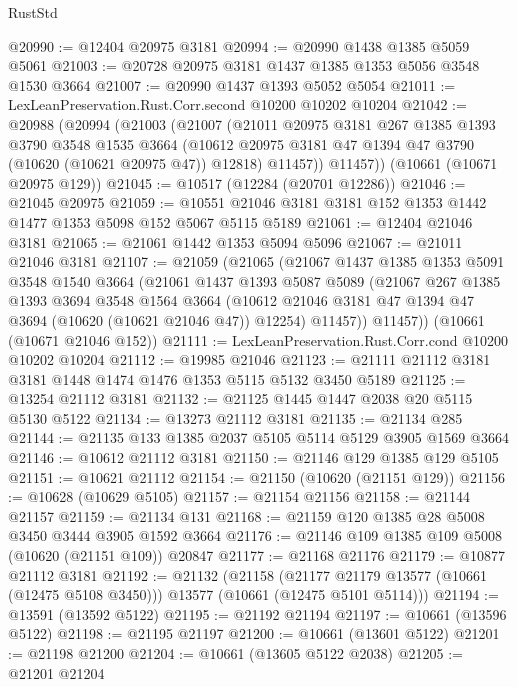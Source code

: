 \begin{lexlean}{RustStd}
\begin{coremodule}
@20990 := @12404 @20975 @3181
@20994 := @20990 @1438 @1385 @5059 @5061
@21003 := @20728 @20975 @3181 @1437 @1385 @1353 @5056 @3548 @1530 @3664
@21007 := @20990 @1437 @1393 @5052 @5054
@21011 := LexLeanPreservation.Rust.Corr.second @10200 @10202 @10204
@21042 := @20988
    (@20994
      (@21003
        (@21007
          (@21011
            @20975
            @3181
            @267
            @1385
            @1393
            @3790
            @3548
            @1535
            @3664
            (@10612 @20975 @3181 @47 @1394 @47 @3790 (@10620 (@10621 @20975 @47)) @12818)
            @11457))
        @11457))
    (@10661 (@10671 @20975 @129))
@21045 := @10517 (@12284 (@20701 @12286))
@21046 := @21045 @20975
@21059 := @10551 @21046 @3181 @3181 @152 @1353 @1442 @1477 @1353 @5098 @152 @5067 @5115 @5189
@21061 := @12404 @21046 @3181
@21065 := @21061 @1442 @1353 @5094 @5096
@21067 := @21011 @21046 @3181
@21107 := @21059
    (@21065
      (@21067
        @1437
        @1385
        @1353
        @5091
        @3548
        @1540
        @3664
        (@21061
          @1437
          @1393
          @5087
          @5089
          (@21067
            @267
            @1385
            @1393
            @3694
            @3548
            @1564
            @3664
            (@10612 @21046 @3181 @47 @1394 @47 @3694 (@10620 (@10621 @21046 @47)) @12254)
            @11457))
        @11457))
    (@10661 (@10671 @21046 @152))
@21111 := LexLeanPreservation.Rust.Corr.cond @10200 @10202 @10204
@21112 := @19985 @21046
@21123 := @21111 @21112 @3181 @3181 @1448 @1474 @1476 @1353 @5115 @5132 @3450 @5189
@21125 := @13254 @21112 @3181
@21132 := @21125 @1445 @1447 @2038 @20 @5115 @5130 @5122
@21134 := @13273 @21112 @3181
@21135 := @21134 @285
@21144 := @21135 @133 @1385 @2037 @5105 @5114 @5129 @3905 @1569 @3664
@21146 := @10612 @21112 @3181
@21150 := @21146 @129 @1385 @129 @5105
@21151 := @10621 @21112
@21154 := @21150 (@10620 (@21151 @129))
@21156 := @10628 (@10629 @5105)
@21157 := @21154 @21156
@21158 := @21144 @21157
@21159 := @21134 @131
@21168 := @21159 @120 @1385 @28 @5008 @3450 @3444 @3905 @1592 @3664
@21176 := @21146 @109 @1385 @109 @5008 (@10620 (@21151 @109)) @20847
@21177 := @21168 @21176
@21179 := @10877 @21112 @3181
@21192 := @21132
    (@21158
      (@21177 @21179 @13577 (@10661 (@12475 @5108 @3450)))
      @13577
      (@10661 (@12475 @5101 @5114)))
@21194 := @13591 (@13592 @5122)
@21195 := @21192 @21194
@21197 := @10661 (@13596 @5122)
@21198 := @21195 @21197
@21200 := @10661 (@13601 @5122)
@21201 := @21198 @21200
@21204 := @10661 (@13605 @5122 @2038)
@21205 := @21201 @21204

\end{coremodule}
\end{lexlean}
